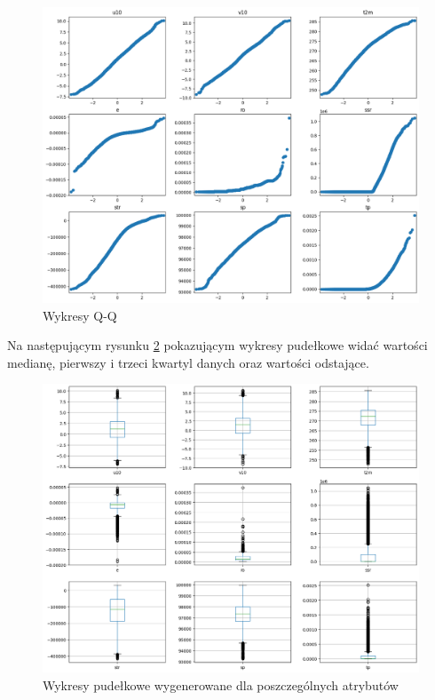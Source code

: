 \begin{figure}[H]
    \centering
    \includegraphics[width=\textwidth]{images/qq.png}
    \caption{Wykresy Q-Q}
    \label{qq}
\end{figure}

Na następującym rysunku \ref{box} pokazującym wykresy pudełkowe widać wartości medianę, pierwszy i trzeci
kwartyl danych oraz wartości odstające. 

\begin{figure}[H]
    \centering
    \includegraphics[width=\textwidth]{images/box.png}
    \caption{Wykresy pudełkowe wygenerowane dla poszczególnych atrybutów}
    \label{box}
\end{figure}

